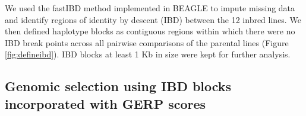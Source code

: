 \documentclass[9pt,twocolumn,twoside]{gsajnl}
\newcommand{\yang}[1]{\textcolor{cyan}{\emph{\bf  #1}} }
\begin{document}
We used the fastIBD method implemented in BEAGLE \citep{Browning2009} to impute missing data and identify regions of identity by descent (IBD) between the 12 inbred lines. 
We then defined haplotype blocks as contiguous regions within which there were no IBD break points across all pairwise comparisons of the parental lines (Figure \ref{fig:defineibd}). IBD blocks at least 1 Kb in size were kept for further analysis. 




\subsection*{Genomic selection using IBD blocks incorporated with GERP scores}
\end{document}
